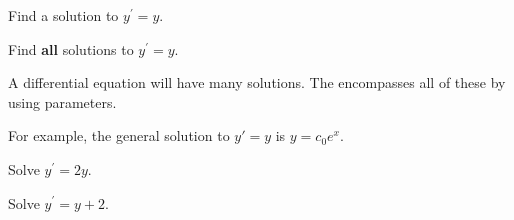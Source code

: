 \begin{applicationActivities}
\begin{activity}{10}
Find a solution to \(y^{\prime}=y\).
\end{activity}

\begin{activity}{5}
Find {\bf all} solutions to \(y^{\prime}=y\).
\end{activity}

\begin{definition}
A differential equation will have many solutions.  The  encompasses all of these by using parameters.

For example, the general solution to \(y'=y\) is \(y=c_0 e^x\).
\end{definition}


\begin{activity}{5}
Solve \(y^{\prime}=2y\).
\end{activity}

\begin{activity}{10}
Solve \(y^{\prime}=y+2\).
\end{activity}



\end{applicationActivities}
